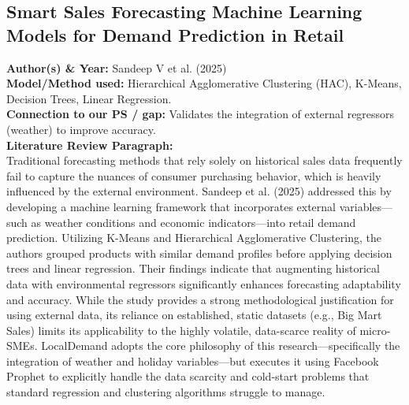 \documentclass[conference]{IEEEtran}
\begin{document}
\subsection{Smart Sales Forecasting Machine Learning Models for Demand Prediction in Retail}
\textbf{Author(s) \& Year:} Sandeep V et al. (2025)\\
\textbf{Model/Method used:} Hierarchical Agglomerative Clustering (HAC), K-Means, Decision Trees, Linear Regression.\\
\textbf{Connection to our PS / gap:} Validates the integration of external regressors (weather) to improve accuracy.\\
\textbf{Literature Review Paragraph:}\\
Traditional forecasting methods that rely solely on historical sales data frequently fail to capture the nuances of consumer purchasing behavior, which is heavily influenced by the external environment. Sandeep et al. (2025) addressed this by developing a machine learning framework that incorporates external variables---such as weather conditions and economic indicators---into retail demand prediction. Utilizing K-Means and Hierarchical Agglomerative Clustering, the authors grouped products with similar demand profiles before applying decision trees and linear regression. Their findings indicate that augmenting historical data with environmental regressors significantly enhances forecasting adaptability and accuracy. While the study provides a strong methodological justification for using external data, its reliance on established, static datasets (e.g., Big Mart Sales) limits its applicability to the highly volatile, data-scarce reality of micro-SMEs. LocalDemand adopts the core philosophy of this research---specifically the integration of weather and holiday variables---but executes it using Facebook Prophet to explicitly handle the data scarcity and cold-start problems that standard regression and clustering algorithms struggle to manage.
\end{document}
